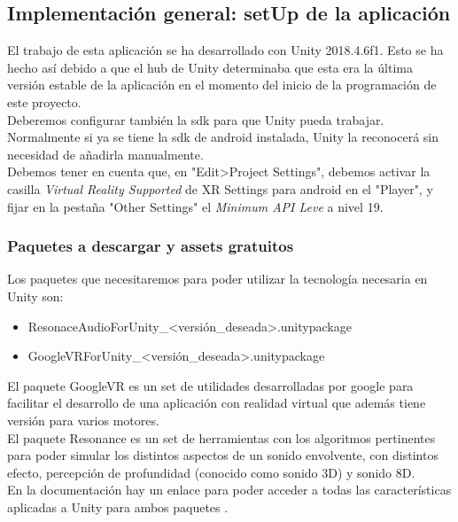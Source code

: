 \subsection{Implementación general: setUp de la aplicación}

\quad El trabajo de esta aplicación se ha desarrollado con Unity 2018.4.6f1. Esto se ha hecho así debido a que el hub de Unity determinaba que esta era la última versión estable de la aplicación en el momento del inicio de la programación de este proyecto.\\

\quad Deberemos configurar también la sdk para que Unity pueda trabajar. Normalmente si ya se tiene la sdk de android instalada, Unity la reconocerá sin necesidad de añadirla manualmente.\\

\quad Debemos tener en cuenta que, en "Edit>Project Settings", debemos activar la casilla \textit{Virtual Reality Supported} de XR Settings para android en el "Player", y fijar en la pestaña "Other Settings" el \textit{Minimum API Leve} a nivel 19.\\

\subsubsection{Paquetes a descargar y assets gratuitos}

\quad Los paquetes que necesitaremos para poder utilizar la tecnología necesaria en Unity son:

\begin{itemize}
	\item ResonaceAudioForUnity\_<versión\_deseada>.unitypackage \cite{DResonance}
	\item GoogleVRForUnity\_<versión\_deseada>.unitypackage \cite{DGvr}
\end{itemize}

\quad El paquete GoogleVR es un set de utilidades desarrolladas por google para facilitar el desarrollo de una aplicación con realidad virtual que además tiene versión para varios motores.\\

\quad El paquete Resonance es un set de herramientas con los algoritmos pertinentes para poder simular los distintos aspectos de un sonido envolvente, con distintos efecto, percepción de profundidad (conocido como sonido 3D) y sonido 8D.\\

\quad En la documentación hay un enlace para poder acceder a todas las características aplicadas a Unity para ambos paquetes \cite{Gvr} \cite{Resonance}.\\


